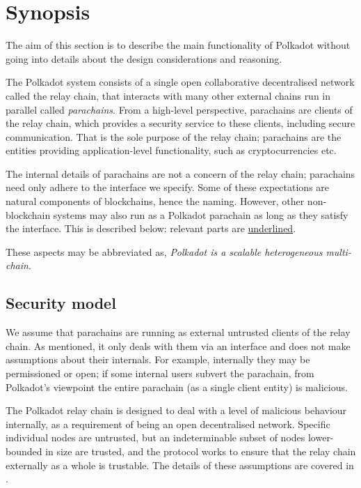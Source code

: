 \section{Synopsis}\label{sec:summary}
The aim of this section is to describe the main functionality of Polkadot without going into details about the design considerations and reasoning.

The Polkadot system consists of a single open collaborative decentralised network called the relay chain, that interacts with many other external chains run in parallel called \emph{parachains}. From a high-level perspective, parachains are clients of the relay chain, which provides a security service to these clients, including secure communication. That is the sole purpose of the relay chain; parachains are the entities providing application-level functionality, such as cryptocurrencies etc.

The internal details of parachains are not a concern of the relay chain; parachains need only adhere to the interface we specify. Some of these expectations are natural components of blockchains, hence the naming. However, other non-blockchain systems may also run as a Polkadot parachain as long as they satisfy the interface. This is described below: relevant parts are \uline{underlined}.

These aspects may be abbreviated as, \emph{Polkadot is a scalable heterogeneous multi-chain}.

\subsection{Security model}

We assume that parachains are running as external untrusted clients of the relay chain. As mentioned, it only deals with them via an interface and does not make assumptions about their internals. For example, internally they may be permissioned or open; if some internal users subvert the parachain, from Polkadot's viewpoint the entire parachain (as a single client entity) is malicious.

The Polkadot relay chain is designed to deal with a level of malicious behaviour internally, as a requirement of being an open decentralised network. Specific individual nodes are untrusted, but an indeterminable subset of nodes lower-bounded in size are trusted, and the protocol works to ensure that the relay chain externally as a whole is trustable. The details of these assumptions are covered in .
